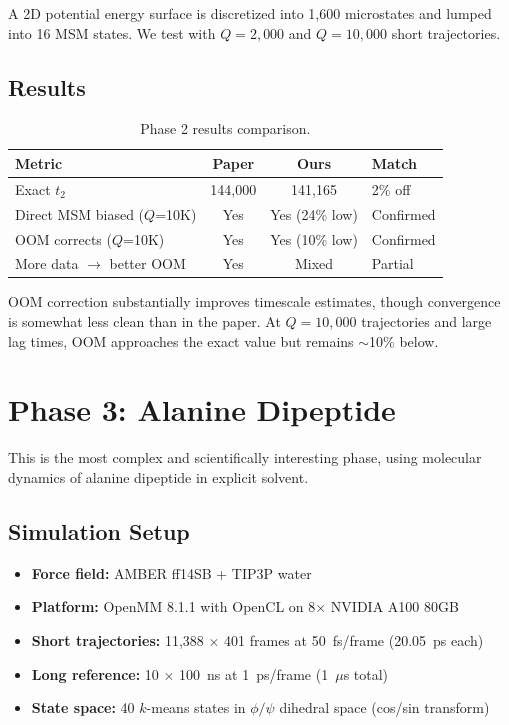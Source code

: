 \documentclass[11pt,a4paper]{article}
\begin{document}
A 2D potential energy surface is discretized into 1{,}600 microstates and lumped into 16 MSM states. We test with $Q = 2{,}000$ and $Q = 10{,}000$ short trajectories.

\subsection{Results}

\begin{table}[H]
\centering
\caption{Phase 2 results comparison.}
\begin{tabular}{lccl}
\toprule
Metric & Paper & Ours & Match \\
\midrule
Exact $t_2$ & 144{,}000 & 141{,}165 & 2\% off \\
Direct MSM biased ($Q$=10K) & Yes & Yes (24\% low) & Confirmed \\
OOM corrects ($Q$=10K) & Yes & Yes (10\% low) & Confirmed \\
More data $\to$ better OOM & Yes & Mixed & Partial \\
\bottomrule
\end{tabular}
\end{table}

OOM correction substantially improves timescale estimates, though convergence is somewhat less clean than in the paper. At $Q = 10{,}000$ trajectories and large lag times, OOM approaches the exact value but remains $\sim$10\% below.

\section{Phase 3: Alanine Dipeptide}

This is the most complex and scientifically interesting phase, using molecular dynamics of alanine dipeptide in explicit solvent.

\subsection{Simulation Setup}

\begin{itemize}[nosep]
    \item \textbf{Force field:} AMBER ff14SB + TIP3P water
    \item \textbf{Platform:} OpenMM 8.1.1 with OpenCL on 8$\times$ NVIDIA A100 80GB
    \item \textbf{Short trajectories:} 11{,}388 $\times$ 401 frames at 50~fs/frame (20.05~ps each)
    \item \textbf{Long reference:} 10 $\times$ 100~ns at 1~ps/frame (1~$\mu$s total)
    \item \textbf{State space:} 40 $k$-means states in $\phi/\psi$ dihedral space (cos/sin transform)
\end{itemize}
\end{document}
